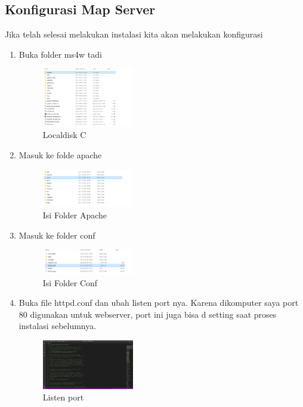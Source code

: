 \subsection{Konfigurasi Map Server}
Jika telah selesai melakukan instalasi kita akan melakukan konfigurasi
\begin{enumerate}
  \item Buka folder ms4w tadi
  \hfill\break
    \begin{figure}[H]
		\includegraphics[width=4cm]{figures/1174026/4/3.png}
		\centering
		\caption{Localdisk C}
    \end{figure}
  \item Masuk ke folde apache
  \hfill\break
    \begin{figure}[H]
		\includegraphics[width=4cm]{figures/1174026/4/4.png}
		\centering
		\caption{Isi Folder Apache}
    \end{figure}
  \item Masuk ke folder conf
  \hfill\break
    \begin{figure}[H]
		\includegraphics[width=4cm]{figures/1174026/4/5.png}
		\centering
		\caption{Isi Folder Conf}
    \end{figure}
  \item Buka file httpd.conf dan ubah listen port nya. Karena dikomputer saya port 80 digunakan untuk webserver, port ini juga bisa d setting saat proses instalasi sebelumnya.
  \hfill\break
    \begin{figure}[H]
		\includegraphics[width=4cm]{figures/1174026/4/6.png}
		\centering
		\caption{Listen port}
    \end{figure}

\end{enumerate}
